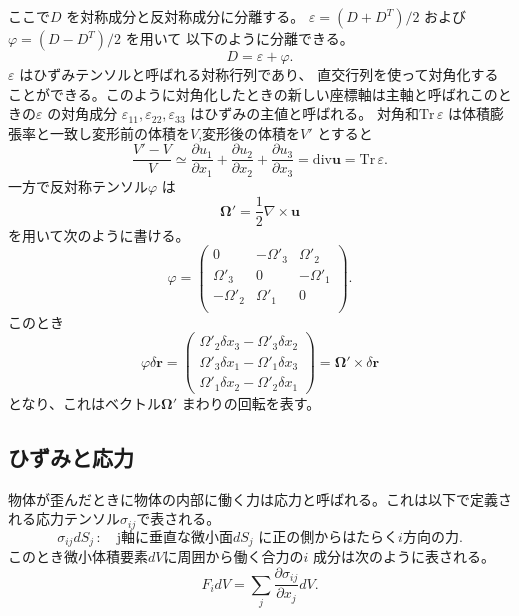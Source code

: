 \documentclass[dvipdfmx]{jsreport}
\numberwithin{equation}{chapter}
\numberwithin{table}{chapter}
\begin{document}
ここで$D$ を対称成分と反対称成分に分離する。
$\varepsilon=(D+D^{T}) /2$ および$\varphi= (D-D^{T}) /2$ を用いて
以下のように分離できる。
\begin{equation}
\label{eq:4}
	D=\varepsilon+\varphi
.\end{equation}
$\varepsilon$ はひずみテンソルと呼ばれる対称行列であり、
直交行列を使って対角化することができる。このように対角化したときの新しい座標軸は主軸と呼ばれこのときの$\varepsilon$ の対角成分
$\varepsilon_{11},\varepsilon_{22},\varepsilon_{33}$ はひずみの主値と呼ばれる。
対角和$\mathrm{Tr}\,\varepsilon$ は体積膨張率と一致し変形前の体積を$V$,変形後の体積を$V'$ とすると
\begin{equation}
\label{eq:5}
	\frac{V'-V}{V}\simeq \frac{\partial u_1}{\partial x_1} +\frac{\partial u_2}{\partial x_2} +\frac{\partial u_3}{\partial x_3} =\mathrm{div} \bm{u}=\mathrm{Tr}\,\varepsilon
.\end{equation}
一方で反対称テンソル$\varphi$ は
\begin{equation}
\label{eq:6}
\bm{\Omega'}=\frac{1}{2}\nabla \times \bm{u}
\end{equation}
を用いて次のように書ける。
\begin{equation}
\label{eq:7}
\varphi=\begin{pmatrix} 0&-\Omega'_3&\Omega'_2\\\Omega'_3&0&-\Omega'_1\\-\Omega'_2&\Omega'_1&0\\ \end{pmatrix} 
.\end{equation}
このとき
\begin{equation}
\label{eq:8}
	\varphi \delta \bm{r}=\begin{pmatrix} \Omega'_2 \delta x_3-\Omega'_3 \delta x_2\\ \Omega'_3 \delta x_1-\Omega'_1 \delta x_3\\\Omega'_1 \delta x_2- \Omega'_2 \delta x_1 \end{pmatrix} =  \bm{\Omega'}\times  \delta \bm{r}
\end{equation}
となり、これはベクトル$\bm{\Omega'}$ まわりの回転を表す。
\subsection{ひずみと応力}
物体が歪んだときに物体の内部に働く力は応力と呼ばれる。これは以下で定義される応力テンソル$\sigma_{ij}$で表される。
\begin{equation}
\label{eq:9}
	\sigma_{ij}dS_j \,:\quad \text{j軸に垂直な微小面$dS_j$ に正の側からはたらく$i$方向の力}
.\end{equation}
このとき微小体積要素$dV$に周囲から働く合力の$i$ 成分は次のように表される。
\begin{equation}
\label{eq:10}
	F_i dV = \sum_{j}^{} \frac{\partial \sigma_{ij}}{\partial x_j} dV
.\end{equation}
\end{document}

